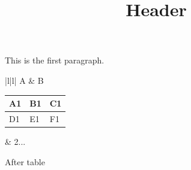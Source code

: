 \documentclass[11pt,a4paper]{article}
\title{Header}
\begin{document}
\maketitle

This is the first paragraph.

\begin{table}[h]
\begin{tabular}{|l|l|}
\hline
A & B \\ \hline
\begin{table}[h] \begin{tabular}{|l|l|l|} \hline A1 & B1 & C1 \\ \hline D1 & E1 & F1 \\ \hline \end{tabular} \end{table} & 2... \\ \hline
\end{tabular}
\end{table}

After table
\end{document}
